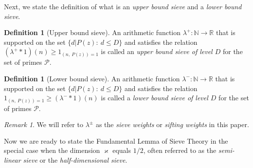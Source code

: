 \documentclass[12pt]{amsart}
\numberwithin{equation}{section}
\theoremstyle{remark}
\newtheorem*{remark}{Remark}
\theoremstyle{definition}
\newtheorem{definition}[theorem]{Definition}
\begin{document}
Next, we state the definition of what is an {\it upper bound sieve} and a {\it lower bound sieve}. 

\begin{definition}[Upper bound sieve]
An arithmetic function $\lambda^+:\mathbb{N}\rightarrow\mathbb{R}$ that is supported on the set $\{d|P(z): \: d \leq D\}$ and satisfies the relation $(\lambda^+*1)(n) \geq 1_{(n,\: P(z))=1}$ is called an \emph{upper bound sieve of level $D$} for the set of primes $\mathcal{P}$.
\end{definition}

\begin{definition}[Lower bound sieve]
An arithmetic function $\lambda^-:\mathbb{N}\rightarrow\mathbb{R}$ that is supported on the set $\{d|P(z): \: d \leq D\}$ and satisfies the relation $1_{(n,\:P(z))=1} \geq (\lambda^-*1)(n)$ is called a \emph{lower bound sieve of level $D$} for the set of primes $\mathcal{P}$.
\end{definition}

\begin{remark}
We will refer to $\lambda^{\pm}$ as the \emph{sieve weights} or \emph{sifting weights} in this paper.
\end{remark}






Now we are ready to state the Fundamental Lemma of Sieve Theory in the special case when the dimension $\varkappa$ equals $1/2$, often referred to as the {\it semi-linear sieve} or the {\it half-dimensional sieve}.
\end{document}

